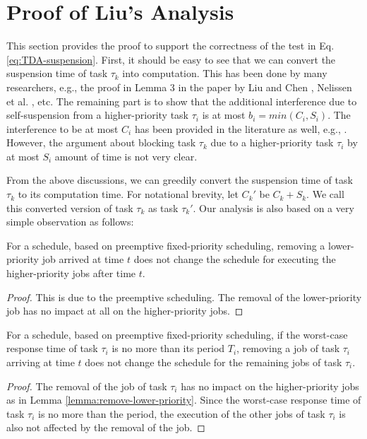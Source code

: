 
\section{Proof of Liu's Analysis}  

This section provides the proof to support the correctness of the test in Eq. \eqref{eq:TDA-suspension}. First, it should be easy to see that we can convert the suspension time of task $\tau_k$ into computation. This has been done by many researchers, e.g., the proof in Lemma 3 in the paper by Liu and Chen \cite{Liu_2014}, Nelissen et al. \cite{ecrts15nelissen}, etc. The remaining part is to show that the additional interference due to self-suspension from a higher-priority task $\tau_i$ is at most $b_i=min(C_i, S_i)$. The interference to be at most $C_i$ has been provided in the literature as well, e.g., \cite{Rajkumar_1990}\cite{Liu_2014}. However, the argument about blocking task $\tau_k$ due to a higher-priority task $\tau_i$ by at most $S_i$ amount of time is not very clear. 

From the above discussions, we can greedily convert the suspension time of task $\tau_k$ to its computation time. For notational brevity, let $C_k'$ be $C_k + S_k$. We call this converted version of task $\tau_k$ as task $\tau_k'$. Our analysis is also based on a very simple observation as follows:
\begin{lemma}
\label{lemma:remove-lower-priority}
  For a schedule, based on preemptive fixed-priority scheduling, removing a lower-priority job arrived at time $t$ does not change the schedule for executing the higher-priority jobs after time $t$.
\end{lemma}
\begin{proof}
  This is due to the preemptive scheduling. The removal of the lower-priority job has no impact at all on the higher-priority jobs.
\end{proof}
\begin{lemma}
\label{lemma:remove-same-task}
  For a schedule, based on preemptive fixed-priority scheduling, if the worst-case response time of task $\tau_i$ is no more than its period $T_i$, removing a job of task $\tau_i$ arriving at time $t$ does not change the schedule for the remaining jobs of task $\tau_i$.
\end{lemma}
\begin{proof}
  The removal of the job of task $\tau_i$ has no impact on the higher-priority jobs as in Lemma \ref{lemma:remove-lower-priority}. Since the worst-case response time of task $\tau_i$ is no more than the period, the execution of the other jobs of task $\tau_i$ is also not affected by the removal of the job.
\end{proof}

